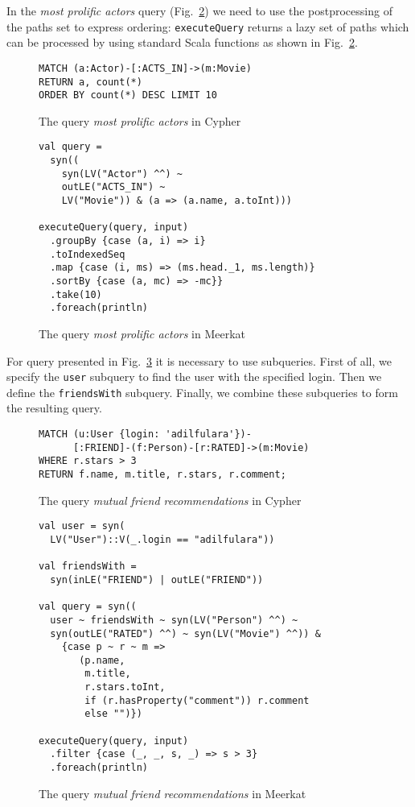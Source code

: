 In the \emph{most prolific actors} query (Fig.~\ref{fig:Q2_C}) we need to use the postprocessing of the paths set to express ordering: \lstinline{executeQuery} returns a lazy set of paths which can be processed by using standard Scala functions as shown in Fig.~\ref{fig:Q2_C}.

\begin{figure}[h]
\begin{lstlisting}
MATCH (a:Actor)-[:ACTS_IN]->(m:Movie)
RETURN a, count(*)
ORDER BY count(*) DESC LIMIT 10
\end{lstlisting}
\caption{The query \emph{most prolific actors} in Cypher}
\label{fig:Q2_C}
\end{figure}


\begin{figure}[h]
\begin{lstlisting}
val query =
  syn((
    syn(LV("Actor") ^^) ~
    outLE("ACTS_IN") ~
    LV("Movie")) & (a => (a.name, a.toInt)))

executeQuery(query, input)
  .groupBy {case (a, i) => i}
  .toIndexedSeq
  .map {case (i, ms) => (ms.head._1, ms.length)}
  .sortBy {case (a, mc) => -mc}}
  .take(10)
  .foreach(println)

\end{lstlisting}
\caption{The query \emph{most prolific actors} in Meerkat}
\label{fig:Q2_C}
\end{figure}

For query presented in Fig.~\ref{fig:Q4_C} it is necessary to use subqueries.
First of all, we specify the \lstinline{user} subquery to find the user with the specified login.
Then we define the \lstinline{friendsWith} subquery.
Finally, we combine these subqueries to form the resulting query.

\begin{figure}[h]
\begin{lstlisting}
MATCH (u:User {login: 'adilfulara'})-
      [:FRIEND]-(f:Person)-[r:RATED]->(m:Movie)
WHERE r.stars > 3
RETURN f.name, m.title, r.stars, r.comment;
\end{lstlisting}
\caption{The query \emph{mutual friend recommendations} in Cypher}
\label{fig:Q4_C}
\end{figure}


\begin{figure}[h]
\begin{lstlisting}
val user = syn(
  LV("User")::V(_.login == "adilfulara"))

val friendsWith =
  syn(inLE("FRIEND") | outLE("FRIEND"))

val query = syn((
  user ~ friendsWith ~ syn(LV("Person") ^^) ~
  syn(outLE("RATED") ^^) ~ syn(LV("Movie") ^^)) &
    {case p ~ r ~ m =>
       (p.name,
        m.title,
        r.stars.toInt,
        if (r.hasProperty("comment")) r.comment
        else "")})

executeQuery(query, input)
  .filter {case (_, _, s, _) => s > 3}
  .foreach(println)

\end{lstlisting}
\caption{The query \emph{mutual friend recommendations} in Meerkat}
\label{fig:Q4_M}
\end{figure}

